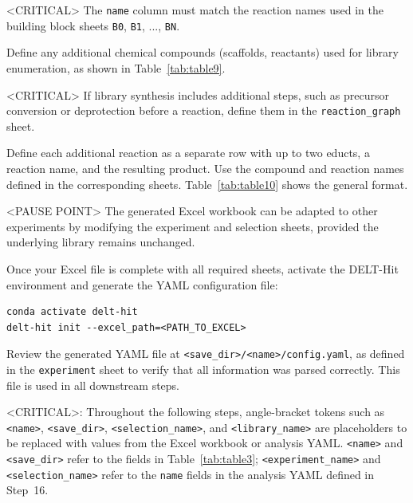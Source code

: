 

<CRITICAL> The \texttt{name} column must match the reaction names used in the building block sheets \texttt{B0}, \texttt{B1}, ..., \texttt{BN}.


Define any additional chemical compounds (scaffolds, reactants) used for library enumeration, as shown in Table~\ref{tab:table9}.




<CRITICAL> If library synthesis includes additional steps, such as precursor conversion or deprotection before a reaction, define them in the \texttt{reaction\_graph} sheet.


Define each additional reaction as a separate row with up to two educts, a reaction name, and the resulting product. Use the compound and reaction names defined in the corresponding sheets. Table~\ref{tab:table10} shows the general format.



<PAUSE POINT> The generated Excel workbook can be adapted to other experiments by modifying the experiment and selection sheets, provided the underlying library remains unchanged.

Once your Excel file is complete with all required sheets, activate the DELT-Hit environment and generate the YAML configuration file:


\begin{lstlisting}
conda activate delt-hit
delt-hit init --excel_path=<PATH_TO_EXCEL>
\end{lstlisting}

Review the generated YAML file at \texttt{\textless save\_dir\textgreater/\textless name\textgreater/config.yaml}, as defined in the \texttt{experiment} sheet to verify that all information was parsed correctly. This file is used in all downstream steps.

<CRITICAL>: Throughout the following steps, angle-bracket tokens such as \texttt{\textless name\textgreater}, \texttt{\textless save\_dir\textgreater}, \texttt{\textless selection\_name\textgreater}, and \texttt{\textless library\_name\textgreater} are placeholders to be replaced with values from the Excel workbook or analysis YAML. \texttt{\textless name\textgreater} and \texttt{\textless save\_dir\textgreater} refer to the fields in Table~\ref{tab:table3}; \texttt{\textless experiment\_name\textgreater} and \texttt{\textless selection\_name\textgreater} refer to the \texttt{name} fields in the analysis YAML defined in Step~16.


